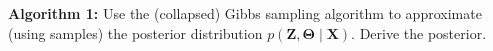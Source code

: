\textbf{Algorithm 1:} Use the (collapsed) Gibbs sampling algorithm to approximate (using samples) the posterior distribution $p(\boldsymbol{Z}, \boldsymbol{\Theta} \mid \boldsymbol{X})
$. Derive the posterior. \\\\